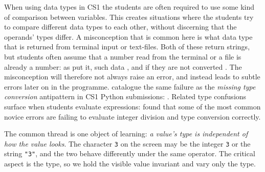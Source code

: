 
When using data types in CS1 the students are often required to use some
kind of comparison between variables. This creates situations where the
students try to compare different data types to each other, without
discerning that the operands' types differ. A misconception that is
common here is what data type that
is returned from terminal input or text-files. Both of these return
strings, but students often assume that a number read from the terminal or
a file is already a number: as \textcite{GuoMarkelZhang2020} put it, such
data , and if they
are not converted . The misconception will therefore not always
raise an error, and instead leads to subtle errors later on in the
programme.
\textcite{Bosse2021Antipatterns} catalogue the same failure as the
\emph{missing type conversion} antipattern in CS1 Python submissions:
.
Related type confusions surface when students evaluate expressions:
\textcite{Gobil2009Errors} found that some of the most common novice errors are
failing to evaluate integer division and type conversion correctly.

The common thread is one object of learning: \emph{a value's type is
independent of how the value looks}. The character \texttt{3} on the
screen may be the integer \texttt{3} or the string
\texttt{"3"}, and the two behave differently under the same
operator. The critical aspect is the type, so we hold the visible value
invariant and vary only the type.

